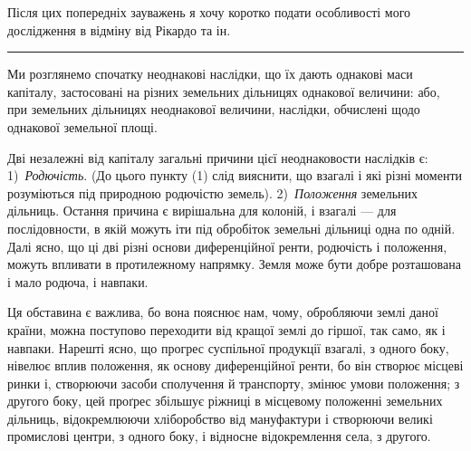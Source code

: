 
Після цих попередніх зауважень я хочу коротко подати особливості мого
дослідження в відміну від Рікардо та ін.

\pfbreak

Ми розглянемо спочатку неоднакові наслідки, що їх дають однакові маси
капіталу, застосовані на різних земельних дільницях однакової величини: або,
при земельних дільницях неоднакової величини, наслідки, обчислені щодо однакової
земельної площі.

Дві незалежні від капіталу загальні причини цієї неоднаковости наслідків
є: 1)~\emph{Родючість}. (До цього пункту (1) слід вияснити, що взагалі і які
різні моменти розуміються під природною родючістю земель). 2)~\emph{Положення}
земельних дільниць. Остання причина є вирішальна для колоній, і взагалі — для
послідовности, в якій можуть іти під обробіток земельні дільниці одна по одній.
Далі ясно, що ці дві різні основи диференційної ренти, родючість і положення,
можуть впливати в протилежному напрямку. Земля може бути добре розташована
і мало родюча, і навпаки.

Ця обставина є важлива, бо вона пояснює нам, чому, обробляючи землі
даної країни, можна поступово переходити від кращої землі до гіршої, так само,
як і навпаки. Нарешті ясно, що прогрес суспільної продукції взагалі, з одного
боку, нівелює вплив положення, як основу диференційної ренти, бо він створює
місцеві ринки і, створюючи засоби сполучення й транспорту, змінює умови
положення; з другого боку, цей проґрес збільшує ріжниці в місцевому положенні
земельних дільниць, відокремлюючи хліборобство від мануфактури і створюючи
великі промислові центри, з одного боку, і відносне відокремлення села, з другого.

